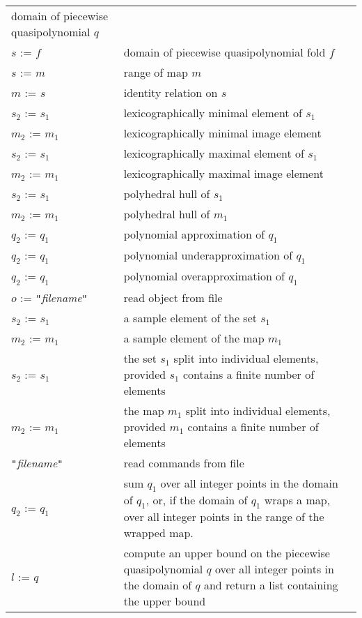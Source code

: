 \begin{supertabular}{p{0.35\textwidth}p{0.6\textwidth}}
domain of piecewise quasipolynomial $q$
\\
$s$ :=  $f$ &
domain of piecewise quasipolynomial fold $f$
\\
$s$ :=  $m$ &
range of map $m$
\\
$m$ :=  $s$ &
identity relation on $s$
\\
$s_2$ :=  $s_1$ &
lexicographically minimal element of $s_1$
\\
$m_2$ :=  $m_1$ &
lexicographically minimal image element
\\
$s_2$ :=  $s_1$ &
lexicographically maximal element of $s_1$
\\
$m_2$ :=  $m_1$ &
lexicographically maximal image element
\\
$s_2$ :=  $s_1$ & polyhedral hull of $s_1$
\\
$m_2$ :=  $m_1$ & polyhedral hull of $m_1$
\\
$q_2$ :=  $q_1$ & polynomial approximation of $q_1$
\\
$q_2$ :=  $q_1$ & polynomial underapproximation of $q_1$
\\
$q_2$ :=  $q_1$ & polynomial overapproximation of $q_1$
\\
$o$ :=  {\tt "}{\it filename}{\tt"} &
read object from file
\\
$s_2$ :=  $s_1$ &
a sample element of the set $s_1$
\\
$m_2$ :=  $m_1$ &
a sample element of the map $m_1$
\\
$s_2$ :=  $s_1$ &
the set $s_1$ split into individual elements,
provided $s_1$ contains a finite number of elements
\\
$m_2$ :=  $m_1$ &
the map $m_1$ split into individual elements,
provided $m_1$ contains a finite number of elements
\\
 {\tt "}{\it filename}{\tt"} &
read commands from file
\\
$q_2$ :=  $q_1$ &
sum $q_1$ over all integer points in the domain of $q_1$,
or, if the domain of $q_1$ wraps a map, over all integer
points in the range of the wrapped map.
\\
$l$ :=  $q$ &
compute an
upper bound on the piecewise quasipolynomial $q$ over
all integer points in the domain of $q$
and return a list containing the upper bound

\end{supertabular}
